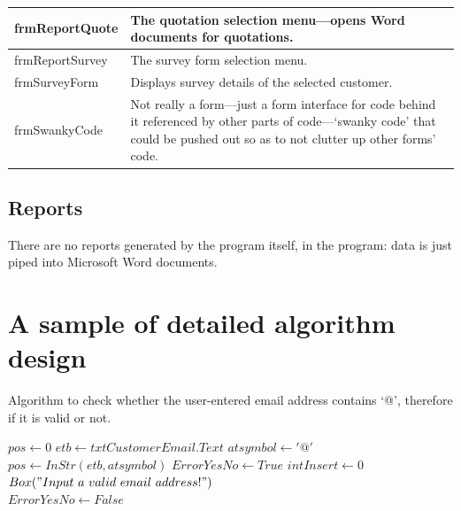 \begin{center}
\begin{longtable}{ | p{4cm} | p{6cm} | }
			\hline
			frmReportQuote & The quotation selection menu---opens Word documents for quotations.\\
			\hline
			frmReportSurvey & The survey form selection menu.\\
			\hline
			frmSurveyForm & Displays survey details of the selected customer.\\
			\hline
			frmSwankyCode & Not really a form---just a form interface for code behind it referenced by other parts of code---`swanky code' that could be pushed out so as to not clutter up other forms' code.\\
			\hline
		\end{longtable}
	\end{center}
	
	\subsection{Reports}
	
There are no reports generated by the program itself, in the program: data is just piped into Microsoft Word documents.
	
	\section{A sample of detailed algorithm design}
	
	Algorithm to check whether the user-entered email address contains `@', therefore if it is valid or not.
	
	\begin{algorithmic}	
		\State $pos \gets 0$
		\State $etb \gets txtCustomerEmail.Text$
		\State $atsymbol \gets '@'$
        \State $pos \gets InStr(etb, atsymbol)$
            \State $ErrorYesNo \gets True$
            \State $intInsert \gets 0$\\
            $Box("Input\ a\ valid\ email\ address!")$
        \Else\\
             $ErrorYesNo \gets False$
        \EndIf	
	\end{algorithmic}

	
